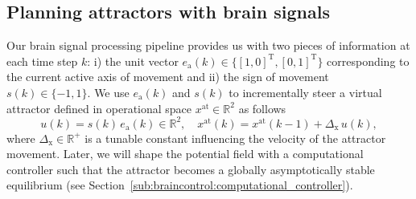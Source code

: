 
\subsection{Planning attractors with brain signals}\label{sub:braincontrol:planning_attractors_switching}
Our brain signal processing pipeline provides us with two pieces of information at each time step $k$: i) the unit vector $e_\mathrm{a}(k) \in \{ [1, 0]^\mathrm{T}, [0, 1]^\mathrm{T} \}$ corresponding to the current active axis of movement %
and ii) the sign of movement $s(k) \in \{ -1, 1 \}$. We use $e_\mathrm{a}(k)$ and $s(k)$ to incrementally steer a virtual attractor defined in operational space $x^\mathrm{at} \in \mathbb{R}^2$ as follows
%
\begin{equation}
    u(k) = s(k) \, e_\mathrm{a}(k) \in \mathbb{R}^2, \quad  x^\mathrm{at}(k) = x^\mathrm{at}(k-1) + \Delta_\mathrm{x} \, u(k),
\end{equation}
where $\Delta_\mathrm{x} \in \mathbb{R}^+$ is a tunable constant influencing the velocity of the attractor movement.
%
Later, we will shape the potential field with a computational controller such that the attractor becomes a globally asymptotically stable equilibrium (see Section~\ref{sub:braincontrol:computational_controller}).

